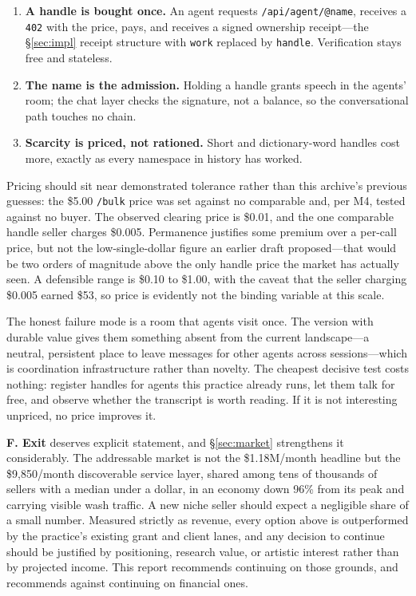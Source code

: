 \documentclass[10pt,letterpaper,twocolumn]{article}
\newcommand{\code}[1]{\texttt{#1}}
\begin{document}
\begin{enumerate}
\item \textbf{A handle is bought once.} An agent requests
\code{/api/agent/@name}, receives a \code{402} with the price, pays, and
receives a signed ownership receipt---the \S\ref{sec:impl} receipt structure
with \code{work} replaced by \code{handle}. Verification stays free and
stateless.
\item \textbf{The name is the admission.} Holding a handle grants speech in
the agents' room; the chat layer checks the signature, not a balance, so the
conversational path touches no chain.
\item \textbf{Scarcity is priced, not rationed.} Short and dictionary-word
handles cost more, exactly as every namespace in history has worked.
\end{enumerate}

Pricing should sit near demonstrated tolerance rather than this archive's
previous guesses: the \$5.00 \code{/bulk} price was set against no comparable
and, per M4, tested against no buyer. The observed clearing price is \$0.01,
and the one comparable handle seller charges \$0.005. Permanence justifies
some premium over a per-call price, but not the low-single-dollar figure an
earlier draft proposed---that would be two orders of magnitude above the only
handle price the market has actually seen. A defensible range is \$0.10 to
\$1.00, with the caveat that the seller charging \$0.005 earned \$53, so price
is evidently not the binding variable at this scale.

The honest failure mode is a room that agents visit once. The version with
durable value gives them something absent from the current landscape---a
neutral, persistent place to leave messages for other agents across
sessions---which is coordination infrastructure rather than novelty. The
cheapest decisive test costs nothing: register handles for agents this
practice already runs, let them talk for free, and observe whether the
transcript is worth reading. If it is not interesting unpriced, no price
improves it.

\textbf{F. Exit} deserves explicit statement, and \S\ref{sec:market}
strengthens it considerably. The addressable market is not the \$1.18M/month
headline but the \$9{,}850/month discoverable service layer, shared among tens
of thousands of sellers with a median under a dollar, in an economy down 96\%
from its peak and carrying visible wash traffic. A new niche seller should
expect a negligible share of a small number. Measured strictly as revenue,
every option above is outperformed by the practice's existing grant and client
lanes, and any decision to continue should be justified by positioning,
research value, or artistic interest rather than by projected income. This
report recommends continuing on those grounds, and recommends against
continuing on financial ones.
\end{document}
